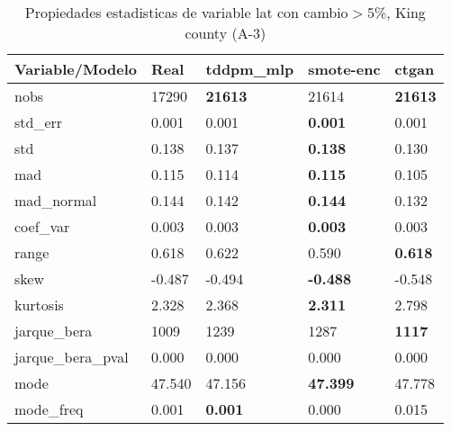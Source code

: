 \begin{table}[H]
\centering
\fontsize{8}{14}\selectfont
\caption{Propiedades estadisticas de variable lat con cambio\ensuremath{>}5\%, King county (A-3)}
\label{table-stats-king county-a-3-lat-short}
\begin{tabular}{|l|m{10em}|m{10em}|m{10em}|m{10em}|}
\hline
 \rowcolor[gray]{0.8}
Variable/Modelo & Real & tddpm\_mlp & smote-enc & ctgan \\
\hline nobs & 17290 & \bfseries 21613 & \cellcolor[rgb]{0.9, 0.54, 0.52} 21614 & \bfseries 21613 \\
\hline std\_err & 0.001 & 0.001 & \bfseries 0.001 & \cellcolor[rgb]{0.9, 0.54, 0.52} 0.001 \\
\hline std & 0.138 & 0.137 & \bfseries 0.138 & \cellcolor[rgb]{0.9, 0.54, 0.52} 0.130 \\
\hline mad & 0.115 & 0.114 & \bfseries 0.115 & \cellcolor[rgb]{0.9, 0.54, 0.52} 0.105 \\
\hline mad\_normal & 0.144 & 0.142 & \bfseries 0.144 & \cellcolor[rgb]{0.9, 0.54, 0.52} 0.132 \\
\hline coef\_var & 0.003 & 0.003 & \bfseries 0.003 & \cellcolor[rgb]{0.9, 0.54, 0.52} 0.003 \\
\hline range & 0.618 & 0.622 & \cellcolor[rgb]{0.9, 0.54, 0.52} 0.590 & \bfseries 0.618 \\
\hline skew & -0.487 & -0.494 & \bfseries -0.488 & \cellcolor[rgb]{0.9, 0.54, 0.52} -0.548 \\
\hline kurtosis & 2.328 & 2.368 & \bfseries 2.311 & \cellcolor[rgb]{0.9, 0.54, 0.52} 2.798 \\
\hline jarque\_bera & 1009 & 1239 & \cellcolor[rgb]{0.9, 0.54, 0.52} 1287 & \bfseries 1117 \\
\hline jarque\_bera\_pval & 0.000 & 0.000 & 0.000 & 0.000 \\
\hline mode & 47.540 & \cellcolor[rgb]{0.9, 0.54, 0.52} 47.156 & \bfseries 47.399 & 47.778 \\
\hline mode\_freq & 0.001 & \bfseries 0.001 & 0.000 & \cellcolor[rgb]{0.9, 0.54, 0.52} 0.015 \\
\hline
\end{tabular}
\end{table}
